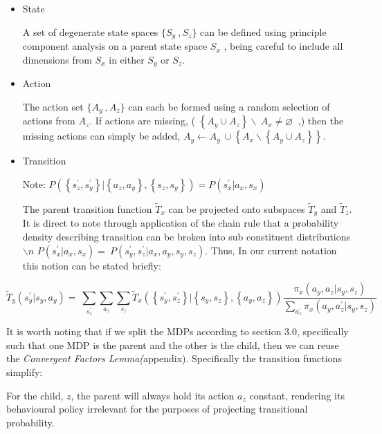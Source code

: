\documentclass[compsoc,journal,letterpaper,10pt,draftclsnofoot,onecolumn]{IEEEtran}
\begin{document}
\begin{itemize}
\item
  State

  A set of degenerate state spaces \(\{ S_{y}\ ,S_{z}\}\) can be defined
  using principle component analysis on a parent state space \(S_{x}\) ,
  being careful to include all dimensions from \(S_{x}\) in either
  \(S_{y}\) or \(S_{z}\).
\item
  Action

  The action set \(\{ A_{y}\ ,A_{z}\}\) can each be formed using a
  random selection of actions from \(A_{z}\). If actions are missing, (
  \(\left\{ A_{y} \cup A_{z} \right\}\backslash\ A_{x} \neq \varnothing\ \)
  ,) then the missing actions can simply be added,
  \(A_{y} \leftarrow A_{y}\  \cup \left\{ A_{x}\backslash\left\{ A_{y} \cup A_{z} \right\} \right\}\).
\item
  Transition

  Note:
  \(P\left( \left\{ s_{z}^{'},s_{y}^{'} \right\}|\left\{ a_{z},a_{y} \right\},\left\{ s_{z},s_{y} \right\} \right) = P\left( s_{x}^{'}|a_{x},s_{x} \right)\)

  The parent transition function \({\tilde{T}}_{x}\) can be projected
  onto subspaces \({\tilde{T}}_{y}\) and \({\tilde{T}}_{z}\). It is
  direct to note through application of the chain rule that a
  probability density describing transition can be broken into sub
  constituent distributions\(\backslash n\)
  \(P\left( s_{x}^{'}|a_{x},s_{x} \right) = \ P\left( s_{y}^{'},s_{z}^{'}|a_{x},a_{y},s_{y},s_{z} \right)\).
  Thus, In our current notation this notion can be stated briefly:
\end{itemize}

 
\begin{equation}
{\tilde{T}}_{y}\left( s_{y}^{'}|s_{y}^{\ },a_{y} \right) = \ \sum_{s_{z}^{'}}^{\ }{\sum_{a_{z}}^{\ }{\sum_{s_{z}}^{\ }{{\tilde{T}}_{x}\left( \left\{ s_{y}^{'},s_{z}^{'} \right\}|\left\{ s_{y}^{\ },s_{z}^{\ } \right\},\left\{ a_{y},a_{z} \right\} \right)\frac{\pi_{x}\left( a_{y},a_{z}|s_{y},s_{z} \right)}{\sum_{a_{z}^{'}}^{\ }{\pi_{x}\left( a_{y},a_{z}^{'}|s_{y},s_{z} \right)}}}}}
\end{equation}
 

It is worth noting that if we split the MDPs according to section 3.0,
specifically such that one MDP is the parent and the other is the child,
then we can reuse the \emph{Convergent Factors Lemma(}appendix).
Specifically the transition functions simplify:

For the child, \(z\), the parent will always hold its action \(a_{z}\)
constant, rendering its behavioural policy irrelevant for the purposes
of projecting transitional probability.
\end{document}
